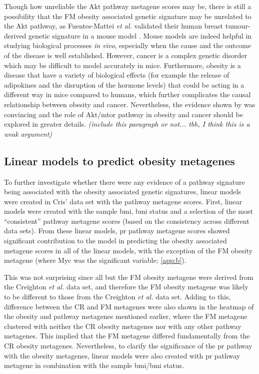 Though how unreliable the Akt pathway metagene scores may be, there is still a possibility that the FM obesity associated genetic signature may be unrelated to the Akt pathway, as Fuentes-Mattei \textit{et al.} validated their human breast tumour-derived genetic signature in a mouse model \citep{Fuentes-Mattei2014}.
Mouse models are indeed helpful in studying biological processes \textit{in vivo}, especially when the cause and the outcome of the disease is well established.
However, cancer is a complex genetic disorder which may be difficult to model accurately in mice.
Furthermore, obesity is a disease that have a variety of biological effects (for example the release of adipokines and the disruption of the hormone levels) that could be acting in a different way in mice compared to humans, which further complicates the causal relationship between obesity and cancer.
Nevertheless, the evidence shown by \citet{Fuentes-Mattei2014} was convincing and the role of Akt/\gls{mtor} pathway in obesity and cancer should be explored in greater details.
\textit{(include this paragraph or not... tbh, I think this is a weak argument)}

\subsection{Linear models to predict obesity metagenes}
\label{sub:linear_models_to_predict_obesity_metagenes}

To further investigate whether there were any evidence of a pathway signature being associated with the obesity associated genetic signatures, linear models were created in Cris' data set with the pathway metagene scores.
First, linear models were created with the sample \gls{bmi}, \gls{bmi} status and a selection of the most ``consistent'' pathway metagene scores (based on the consistency across different data sets).
From these linear models, \gls{pr} pathway metagene scores showed significant contribution to the model in predicting the obesity associated metagene scores in all of the linear models, with the exception of the FM obesity metagene (where Myc was the significant variable; \cref{app:b}).

This was not surprising since all but the FM obesity metagene were derived from the Creighton \textit{et al.} data set, and therefore the FM obesity metagene was likely to be different to those from the Creighton \textit{et al.} data set.
Adding to this, difference between the CR and FM metagenes were also shown in the heatmap of the obesity and pathway metagenes mentioned earlier, where the FM metagene clustered with neither the CR obesity metagenes nor with any other pathway metagenes.
This implied that the FM metagene differed fundamentally from the CR obesity metagenes.
Nevertheless, to clarify the significance of the \gls{pr} pathway with the obesity metagenes, linear models were also created with \gls{pr} pathway metagene in combination with the sample \gls{bmi}/\gls{bmi} status.

